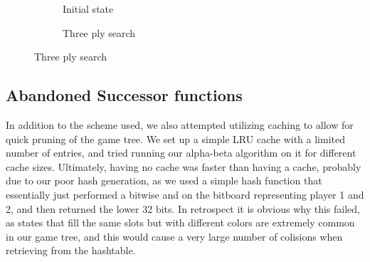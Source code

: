 \documentclass{article}
\newcommand{\rd}{\node [player, fill=red]{};}
\newcommand{\yw}{\node [player, fill=yellow] {};}
\newcommand{\gy}{\node [player, fill=white] {};}
\begin{document}
\begin{figure}[h]
	\centering
	\begin{subfigure}[b]{0.4\textwidth}
		\centering
		\caption{Initial state}
		\label{fig:1}
	\end{subfigure}
	\begin{subfigure}[b]{0.4\textwidth}
		\centering
		\caption{Three ply search}
		\label{fig:2}
	\end{subfigure}
		
\end{figure}	

\subsection{Abandoned Successor functions}
In addition to the scheme used, we also attempted utilizing caching to allow for quick pruning of the game tree. We set up a simple LRU cache with a limited number of entries, and tried running our alpha-beta algorithm on it for different cache sizes. Ultimately, having no cache was faster than having a cache, probably due to our poor hash generation, as we used a simple hash function that essentially just performed a bitwise and on the bitboard representing player 1 and 2, and then returned the lower 32 bits. In retrospect it is obvious why this failed, as states that fill the same slots but with different colors are extremely common in our game tree, and this would cause a very large number of colisions when retrieving from the hashtable.
\end{document}
